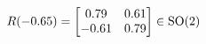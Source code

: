 \documentclass[preview]{standalone}
\begin{document}
\begin{align*}
\special{dvisvgm:raw <g id='unique000'>}R(-0.65) = \begin{bmatrix} 0.79 & 0.61 \\ -0.61 & 0.79 \end{bmatrix} \in \text{SO}(2)\special{dvisvgm:raw </g>}
\end{align*}
\end{document}
